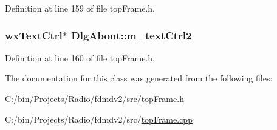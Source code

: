 Definition at line 159 of file top\-Frame.\-h.

\hypertarget{class_dlg_about_adc2a2d88de8cb15fcc4c9c943153df27}{
\subsubsection[{m\-\_\-text\-Ctrl2}]{\setlength{\rightskip}{0pt plus 5cm}wx\-Text\-Ctrl$\ast$ Dlg\-About\-::m\-\_\-text\-Ctrl2\hspace{0.3cm}{\ttfamily [protected]}}}\label{class_dlg_about_adc2a2d88de8cb15fcc4c9c943153df27}


Definition at line 160 of file top\-Frame.\-h.



The documentation for this class was generated from the following files\-:\begin{DoxyCompactItemize}
\item 
C\-:/bin/\-Projects/\-Radio/fdmdv2/src/\hyperlink{top_frame_8h}{top\-Frame.\-h}\item 
C\-:/bin/\-Projects/\-Radio/fdmdv2/src/\hyperlink{top_frame_8cpp}{top\-Frame.\-cpp}\end{DoxyCompactItemize}
